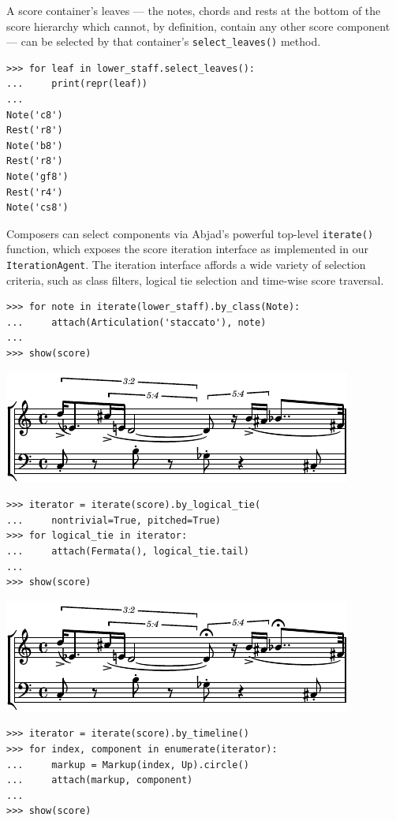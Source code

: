 \documentclass{article}
\begin{document}
A score container's leaves --- the notes, chords and rests at the bottom of the
score hierarchy which cannot, by definition, contain any other score component
--- can be selected by that container's \texttt{select\_leaves()} method.

\begin{lstlisting}
>>> for leaf in lower_staff.select_leaves():
...     print(repr(leaf))
... 
Note('c8')
Rest('r8')
Note('b8')
Rest('r8')
Note('gf8')
Rest('r4')
Note('cs8')
\end{lstlisting}


Composers can select components via Abjad's powerful top-level
\texttt{iterate()} function, which exposes the score iteration interface as
implemented in our \texttt{IterationAgent}. The iteration interface affords a
wide variety of selection criteria, such as class filters, logical tie
selection and time-wise score traversal.

\begin{lstlisting}
>>> for note in iterate(lower_staff).by_class(Note):
...     attach(Articulation('staccato'), note)
... 
>>> show(score)
\end{lstlisting}

\noindent\includegraphics[scale=1.0]{images/abjad-9.pdf}


\begin{lstlisting}
>>> iterator = iterate(score).by_logical_tie(
...     nontrivial=True, pitched=True)
>>> for logical_tie in iterator:
...     attach(Fermata(), logical_tie.tail)
... 
>>> show(score)
\end{lstlisting}

\noindent\includegraphics[scale=1.0]{images/abjad-10.pdf}


\begin{lstlisting}
>>> iterator = iterate(score).by_timeline()
>>> for index, component in enumerate(iterator):
...     markup = Markup(index, Up).circle()
...     attach(markup, component)
... 
>>> show(score)
\end{lstlisting}
\end{document}
